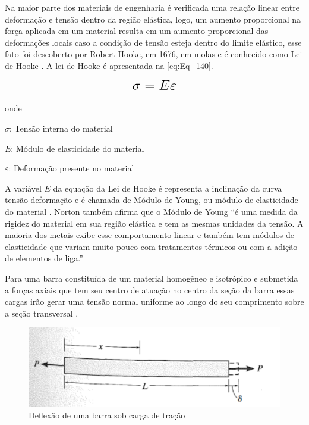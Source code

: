 Na maior parte dos materiais de engenharia é verificada uma relação linear entre deformação e tensão dentro da região elástica, logo, um aumento proporcional
na força aplicada em um material resulta em um aumento proporcional das deformações locais caso a condição de tensão esteja dentro do limite elástico, esse fato
foi descoberto por Robert Hooke, em 1676, em molas e é conhecido como Lei de Hooke \autocite{Hibbeler2010}. A lei de Hooke é apresentada na \autoref{eq:Eq_140}.

\begin{equation}\label{eq:Eq_140}%
\mbox{\fontsize{17.28}{21.6}\selectfont\( %
\sigma = E \varepsilon
\)} %
\end{equation}

onde

$\sigma $: Tensão interna do material

$E$: Módulo de elasticidade do material

$\varepsilon$: Deformação presente no material

\hfill

A variável $E$ da equação da Lei de Hooke é representa a inclinação da curva tensão-deformação e é chamada de Módulo de Young, ou módulo de elasticidade do
material \autocite{Norton2011}. Norton também afirma que o Módulo de Young “é uma medida da rigidez do material em sua região elástica e tem as mesmas unidades da tensão.
A maioria dos metais exibe esse comportamento linear e também tem módulos de elasticidade que variam muito pouco com tratamentos térmicos ou com a adição de elementos de liga.”

Para uma barra constituída de um material homogêneo e isotrópico e submetida a forças axiais que tem seu centro de atuação no centro da seção da barra essas cargas
irão gerar uma tensão normal uniforme ao longo do seu comprimento sobre a seção transversal \autocite{Hibbeler2010}.

\begin{figure}[htb]
	\caption{\label{fig:1030} Deflexão de uma barra sob carga de tração}
	\begin{center}
		\includegraphics[width=\textwidth]{pictures/1030.png}
	\end{center}
\end{figure}

